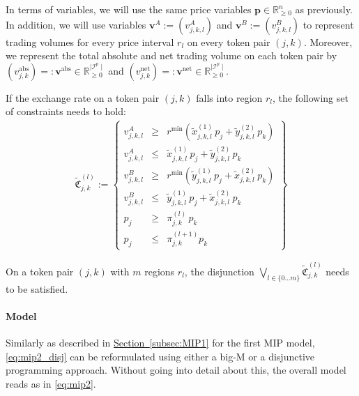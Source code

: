 \documentclass[11pt,parskip=full]{scrartcl}%
\newcommand*{\Min}{\mathrm{min}}
\newcommand*{\itokenpairs}{\mathcal{I}^p}   %
\newcommand*{\subsecref}[1]{\hyperref[{#1}]{Section~\ref*{#1}}}
\begin{document}
In terms of variables, we will use the same price variables $ \mathbf{p} \in \mathbb{R}^n_{\ge 0} $
as previously.
In addition, we will use variables $ \mathbf{v}^A := (v^A_{j,k,l}) $ and
$ \mathbf{v}^B := (v^B_{j,k,l}) $ to represent trading volumes for every price interval $ r_l $ on
every token pair $ (j,k) $.
Moreover, we represent the total absolute and net trading volume on each token pair by
$(v_{j,k}^\mathrm{abs}) =: \mathbf{v}^\mathrm{abs} \in \mathbb{R}_{\ge 0}^{\mid \itokenpairs \mid}$
and
$(v_{j,k}^\mathrm{net}) =: \mathbf{v}^\mathrm{net} \in \mathbb{R}_{\ge 0}^{\mid \itokenpairs \mid}$.

\newpage
If the exchange rate on a token pair $ (j,k) $ falls into region $ r_l $, the following set of
constraints needs to hold:
\begin{align}
  \tilde{\mathfrak{C}}^{(l)}_{j,k} := \left\{
  \begin{array}{rll}
    v^A_{j,k,l}
      &\ge & r^\Min \left( \tilde{x}_{j,k,l}^{(1)} \, p_j + \tilde{y}_{j,k,l}^{(2)} \, p_k \right)
    \\[2mm]
    v^A_{j,k,l}
      &\le & \tilde{x}_{j,k,l}^{(1)} \, p_j + \tilde{y}_{j,k,l}^{(2)} \, p_k
    \\[4mm]
    v^B_{j,k,l}
      &\ge & r^\Min \left( \tilde{y}_{j,k,l}^{(1)} \, p_j + \tilde{x}_{j,k,l}^{(2)} \, p_k \right)
    \\[2mm]
    v^B_{j,k,l}
      &\le & \tilde{y}_{j,k,l}^{(1)} \, p_j + \tilde{x}_{j,k,l}^{(2)} \, p_k
    \\[4mm]
    p_j & \ge & \pi_{j,k}^{(l)} \, p_k \\[2mm]
    p_j & \le & \pi_{j,k}^{(l+1)} p_k
  \end{array}
  \right\}
  \label{eq:mip2_disj}
\end{align}

On a token pair $ (j,k) $ with $ m $ regions $ r_l $, the disjunction
$ \bigvee\limits_{l \in \{0 \ldots m\}} \tilde{\mathfrak{C}}^{(l)}_{j,k} $
needs to be satisfied.

\paragraph{Model}

Similarly as described in \subsecref{subsec:MIP1} for the first MIP model, \eqref{eq:mip2_disj} can
be reformulated using either a big-M or a disjunctive programming approach.
Without going into detail about this, the overall model reads as in \eqref{eq:mip2}.
\end{document}
